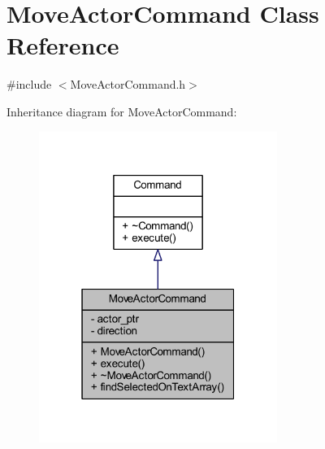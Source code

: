 \hypertarget{class_move_actor_command}{}\section{Move\+Actor\+Command Class Reference}
\label{class_move_actor_command}


{\ttfamily \#include $<$Move\+Actor\+Command.\+h$>$}



Inheritance diagram for Move\+Actor\+Command\+:\nopagebreak
\begin{figure}[H]
\begin{center}
\leavevmode
\includegraphics[width=220pt]{class_move_actor_command__inherit__graph}
\end{center}
\end{figure}


